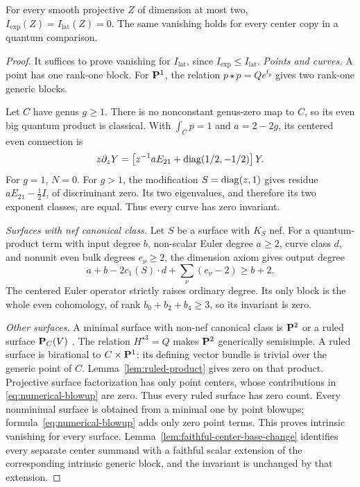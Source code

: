 \begin{proposition}
\label{prop:atomic-lowdim}
%
%
%
%
For every smooth projective \(Z\) of dimension at most two,
\(I_{\mathrm{exp}}(Z)=I_{\mathrm{lat}}(Z)=0\).  The same vanishing holds
for every center copy in a quantum comparison.
\end{proposition}

\begin{proof}
It suffices to prove vanishing for \(I_{\mathrm{lat}}\), since
\(I_{\mathrm{exp}}\leq I_{\mathrm{lat}}\).
\emph{Points and curves.}
A point has one rank-one block.  For \(\mathbf P^1\), the relation
\(p\star p=Qe^{t_p}\) gives two rank-one generic blocks.

Let \(C\) have genus \(g\ge1\).  There is no nonconstant genus-zero map to
\(C\), so its even big quantum product is classical.  With
\(\int_Cp=1\) and \(a=2-2g\), its centered even connection is
\[
 z\partial_zY=
 \left[z^{-1}aE_{21}+\operatorname{diag}(1/2,-1/2)\right]Y.
\]
For \(g=1\), \(N=0\).  For \(g>1\), the modification
\(S=\operatorname{diag}(z,1)\) gives residue \(aE_{21}-\tfrac12I\), of discriminant zero.
Its two eigenvalues, and therefore its two exponent classes, are equal.  Thus
every curve has zero invariant.

\smallskip
\noindent\emph{Surfaces with nef canonical class.}
Let \(S\) be a surface with \(K_S\) nef.  For a quantum-product term with
input degree \(b\), non-scalar Euler degree \(a\ge2\), curve class \(d\), and
nonunit even bulk degrees \(e_\nu\ge2\), the dimension axiom gives output
degree
\[
 a+b-2c_1(S)\cdot d+\sum_\nu(e_\nu-2)\ge b+2.
\]
The centered Euler operator strictly raises ordinary degree.  Its only block
is the whole even cohomology, of rank \(b_0+b_2+b_4\ge3\), so its invariant is
zero.

\smallskip
\noindent\emph{Other surfaces.}
A minimal surface with non-nef canonical class is \(\mathbf P^2\) or a ruled
surface \(\mathbf P_C(V)\) \cite[Chapter~VI]{BeauvilleSurfaces}.  The relation
\(H^{\star3}=Q\) makes \(\mathbf P^2\) generically semisimple.  A ruled surface is birational to $C\times\mathbf P^1$: its defining vector
bundle is trivial over the generic point of $C$.
Lemma~\ref{lem:ruled-product} gives zero on that product. Projective surface
factorization has only point centers, whose contributions in
\eqref{eq:numerical-blowup} are zero. Thus every ruled surface has zero count.
Every nonminimal surface is obtained from a minimal one by point blowups;
formula~\eqref{eq:numerical-blowup} adds only zero point terms.  This proves
intrinsic vanishing for every surface.
Lemma~\ref{lem:faithful-center-base-change} identifies every separate center
summand with a faithful scalar extension of the corresponding intrinsic generic
block, and the invariant is unchanged by that extension.
%
%
\end{proof}

